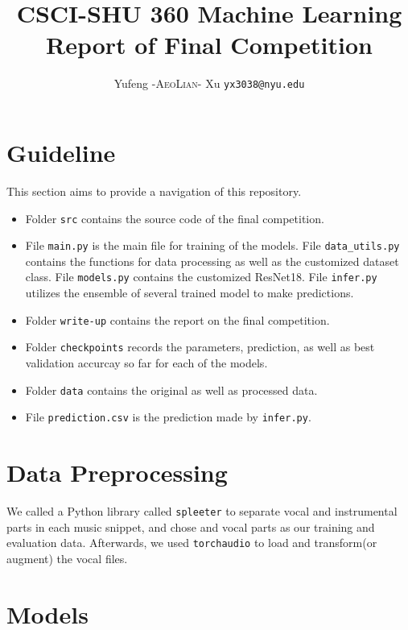 \documentclass{article}
\title{CSCI-SHU 360 Machine Learning\\
    Report of Final Competition}
\author{Yufeng \textsc{-AeoLian-} Xu  \texttt{yx3038@nyu.edu}}
\begin{document}
    \maketitle

    \section{Guideline}
    This section aims to provide a navigation of this repository. 
    \begin{itemize}
        \item Folder \texttt{src} contains the source code of the final competition.
        \item File \texttt{main.py} is the main file for training of the models. File \texttt{data\_utils.py} contains the functions for data processing as well as the customized dataset class. File \texttt{models.py} contains the customized ResNet18. File \texttt{infer.py} utilizes the ensemble of several trained model to make predictions.
        \item Folder \texttt{write-up} contains the report on the final competition.
        \item Folder \texttt{checkpoints} records the parameters, prediction, as well as best validation accurcay so far for each of the models.
        \item Folder \texttt{data} contains the original as well as processed data.
        \item File \texttt{prediction.csv} is the prediction made by \texttt{infer.py}.
    \end{itemize}

    \section{Data Preprocessing}
    We called a Python library called \texttt{spleeter} to separate vocal and instrumental parts in each music snippet, and chose and vocal parts as our training and evaluation  data. Afterwards, we used \texttt{torchaudio} to load and transform(or augment) the vocal files.

    \section{Models}
\end{document}
